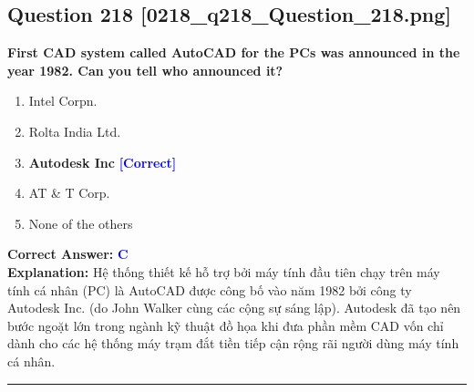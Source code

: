 \documentclass[11pt,a4paper]{article}
\begin{document}
\begin{minipage}{\textwidth}
\subsection*{Question 218 \quad \footnotesize{[0218\_q218\_Question\_218.png]}}
\noindent \textbf{First CAD system called AutoCAD for the PCs was announced in the year 1982. Can you tell who announced it?}

\begin{enumerate}[label=\Alph*.]
    \item Intel Corpn.
    \item Rolta India Ltd.
    \item \textbf{Autodesk Inc} \hfill \textcolor{blue}{\textbf{[Correct]}}
    \item AT \& T Corp.
    \item None of the others
\end{enumerate}

\noindent \textbf{Correct Answer:} \textcolor{blue}{\textbf{C}} \\[2pt]
\noindent \textbf{Explanation:} Hệ thống thiết kế hỗ trợ bởi máy tính đầu tiên chạy trên máy tính cá nhân (PC) là AutoCAD được công bố vào năm 1982 bởi công ty Autodesk Inc. (do John Walker cùng các cộng sự sáng lập). Autodesk đã tạo nên bước ngoặt lớn trong ngành kỹ thuật đồ họa khi đưa phần mềm CAD vốn chỉ dành cho các hệ thống máy trạm đắt tiền tiếp cận rộng rãi người dùng máy tính cá nhân.

\par\vspace{0.3cm}
\hrule
\vspace{0.3cm}
\end{minipage}
\end{document}
